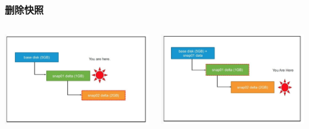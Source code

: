\documentclass[UTF8,8pt,xcolor=dvipsnames]{beamer}
\begin{document}
\begin{frame}[fragile]
    \frametitle{删除快照}
    \begin{columns}
        \begin{column}{0.5\textwidth}
            \begin{center}
                \includegraphics[width=1.0\textwidth]{../imgs/snap-delete-leaf.png}
            \end{center}
        \end{column}

        \begin{column}{0.5\textwidth}
            \begin{center}
                \includegraphics[width=1.0\textwidth]{../imgs/snap-delete-non-leaf.png}
            \end{center}
        \end{column}
    \end{columns}
\end{frame}
\end{document}
